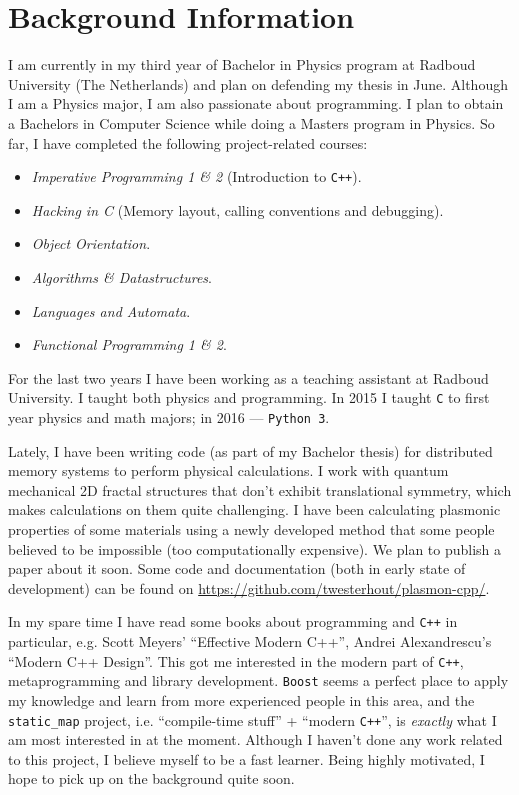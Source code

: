 \documentclass[a4paper,12pt]{article}
\begin{document}
\section{Background Information}
    I am currently in my third year of Bachelor in Physics program at Radboud University (The Netherlands) and plan on defending my thesis in June. Although I am a Physics major, I am also passionate about programming. I plan to obtain a Bachelors in Computer Science while doing a Masters program in Physics. So far, I have completed the following project-related courses:
    \begin{itemize}
    \item \textit{Imperative Programming 1 \& 2} (Introduction to \texttt{C++}).
    \item \textit{Hacking in C} (Memory layout, calling conventions and debugging). 
    \item \textit{Object Orientation}.
    \item \textit{Algorithms \& Datastructures}.
    \item \textit{Languages and Automata}.
    \item \textit{Functional Programming 1 \& 2}.
    \end{itemize}

    For the last two years I have been working as a teaching assistant at Radboud University. I taught both physics and programming. In 2015 I taught \texttt{C} to first year physics and math majors; in 2016 --- \texttt{Python 3}. 

    Lately, I have been writing code (as part of my Bachelor thesis) for distributed memory systems to perform physical calculations. I work with quantum mechanical 2D fractal structures that don't exhibit translational symmetry, which makes calculations on them quite challenging. I have been calculating plasmonic properties of some materials using a newly developed method that some people believed to be impossible (too computationally expensive). We plan to publish a paper about it soon. Some code and documentation (both in early state of development) can be found on \url{https://github.com/twesterhout/plasmon-cpp/}.

    In my spare time I have read some books about programming and \texttt{C++} in particular, e.g. Scott Meyers' ``Effective Modern C++'', Andrei Alexandrescu's ``Modern C++ Design''. This got me interested in the modern part of \texttt{C++}, metaprogramming and library development. \texttt{Boost} seems a perfect place to apply my knowledge and learn from more experienced people in this area, and the \texttt{static\_map} project, i.e. ``compile-time stuff'' + ``modern \texttt{C++}'', is \textit{exactly} what I am most interested in at the moment. Although I haven't done any work related to this project, I believe myself to be a fast learner. Being highly motivated, I hope to pick up on the background quite soon. 
    
\end{document}
